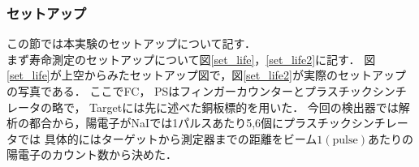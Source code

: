 \subsubsection{セットアップ}
この節では本実験のセットアップについて記す．\\
まず寿命測定のセットアップについて図\ref{set_life}，\ref{set_life2}に記す．
図\ref{set_life}が上空からみたセットアップ図で，図\ref{set_life2}が実際のセットアップの写真である．
ここでFC， PSはフィンガーカウンターとプラスチックシンチレータの略で， Targetには先に述べた銅板標的を用いた．
今回の検出器では解析の都合から，陽電子がNaIでは1パルスあたり5,6個にプラスチックシンチレータでは%
具体的にはターゲットから測定器までの距離をビーム$1(\mathrm{pulse})$あたりの陽電子のカウント数から決めた．
